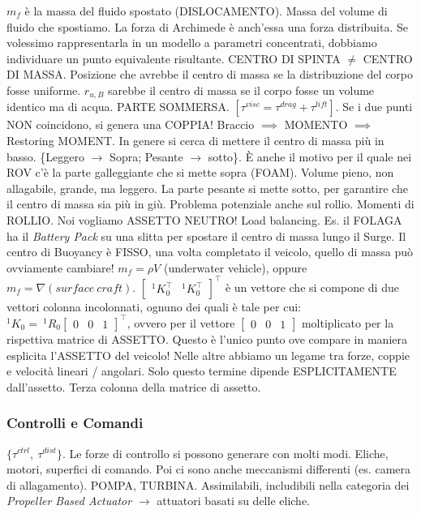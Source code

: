 $m_f$ è la massa del fluido spostato (DISLOCAMENTO). Massa del volume di fluido che spostiamo. La forza di Archimede è anch'essa una forza distribuita. Se volessimo rappresentarla in un modello a parametri concentrati, dobbiamo individuare un punto equivalente risultante. CENTRO DI SPINTA $\neq$ CENTRO DI MASSA. Posizione che avrebbe il centro di massa se la distribuzione del corpo fosse uniforme. $r_{u,B}$ sarebbe il centro di massa se il corpo fosse un volume identico ma di acqua. PARTE SOMMERSA. $[\tau^{visc}=\tau^{drag}+\tau^{lift}]$. Se i due punti NON coincidono, si genera una COPPIA! Braccio $\implies$ MOMENTO $\implies$ Restoring MOMENT. In genere si cerca di mettere il centro di massa più in basso. \{Leggero $\rightarrow$ Sopra; Pesante $\rightarrow$ sotto\}. \`E anche il motivo per il quale nei ROV c'è la parte galleggiante che si mette sopra (FOAM). Volume pieno, non allagabile, grande, ma leggero. La parte pesante si mette sotto, per garantire che il centro di massa sia più in giù. Problema potenziale anche sul rollio. Momenti di ROLLIO. Noi vogliamo ASSETTO NEUTRO! Load balancing. Es. il FOLAGA ha il \textit{Battery Pack} su una slitta per spostare il centro di massa lungo il Surge. Il centro di Buoyancy è FISSO, una volta completato il veicolo, quello di massa può ovviamente cambiare! $m_f=\rho V$ (underwater vehicle), oppure $m_f=\nabla{(surface\ craft)}$. $\begin{bmatrix}^1K_0^\top&^1K_0^\top\end{bmatrix}^\top$ è un vettore che si compone di due vettori colonna incolonnati, ognuno dei quali è tale per cui: $^1K_0=\ ^1R_0\begin{bmatrix}0&0&1\end{bmatrix}^\top$, ovvero per il vettore $\begin{bmatrix}0&0&1\end{bmatrix}$ moltiplicato per la rispettiva matrice di ASSETTO. Questo è l'unico punto ove compare in maniera esplicita l'ASSETTO del veicolo! Nelle altre abbiamo un legame tra forze, coppie e velocità lineari / angolari. Solo questo termine dipende ESPLICITAMENTE dall'assetto. Terza colonna della matrice di assetto.


\subsubsection{Controlli e Comandi}

$\{\tau^{ctrl},\ \tau^{dist}\}$. Le forze di controllo si possono generare con molti modi. Eliche, motori, superfici di comando. Poi ci sono anche meccanismi differenti (es. camera di allagamento). POMPA, TURBINA. Assimilabili, includibili nella categoria dei \textit{Propeller Based Actuator} $\rightarrow$ attuatori basati su delle eliche.

